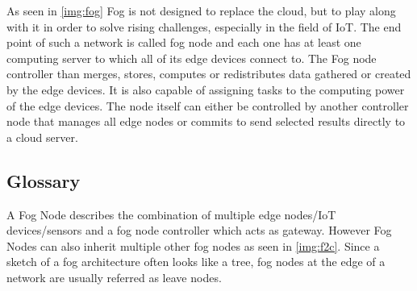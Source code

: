 \cite[p. 862]{DBLP:journals/iotj/ChiangZ16}

As seen in \autoref{img:fog} Fog is not designed to replace the cloud, but to play along with it in order to solve rising challenges, especially in the field of IoT. The end point of such a network is called fog node and each one has at least one computing server to which all of its edge devices connect to. The Fog node controller than merges, stores, computes or redistributes data gathered or created by the edge devices. It is also capable of assigning tasks to the computing power of the edge devices. The node itself can either be controlled by another controller node that manages all edge nodes or commits to send selected results directly to a cloud server.

\subsection{Glossary}

A Fog Node describes the combination of multiple edge nodes/IoT devices/sensors and a fog node controller which acts as gateway. However Fog Nodes can also inherit multiple other fog nodes as seen in \autoref{img:f2c}. Since a sketch of a fog architecture often looks like a tree, fog nodes at the edge of a network are usually referred as leave nodes.


